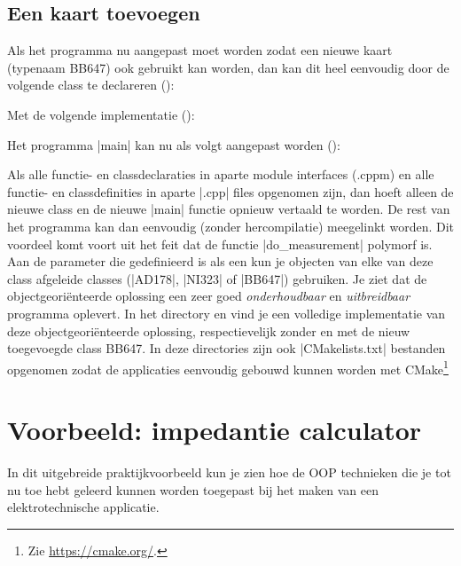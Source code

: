 \begin{cpplstShortInline}
\subsection{Een kaart toevoegen}
Als het programma nu aangepast moet worden zodat een nieuwe kaart (typenaam BB647) ook gebruikt kan worden, dan kan dit heel eenvoudig door de volgende class te declareren ():

Met de volgende implementatie ():

Het programma |main| kan nu als volgt aangepast worden ():

Als alle functie- en classdeclaraties in aparte module interfaces (.cppm) en alle functie- en classdefinities in aparte |.cpp| files opgenomen zijn, dan hoeft alleen de nieuwe class en de nieuwe |main| functie opnieuw vertaald te worden.
De rest van het programma kan dan eenvoudig (zonder hercompilatie) meegelinkt worden.
Dit voordeel komt voort uit het feit dat de functie |do_measurement| polymorf is.
Aan de parameter die gedefinieerd is als een \hbox{} kun je objecten van elke van deze class afgeleide classes (|AD178|, |NI323| of |BB647|) gebruiken.
Je ziet dat de objectgeoriënteerde oplossing een zeer goed \emph{onderhoudbaar} en \emph{uitbreidbaar} programma oplevert.
In het directory  en  vind je een volledige implementatie van deze objectgeoriënteerde oplossing, respectievelijk zonder en met de nieuw toegevoegde class BB647.
In deze directories zijn ook |CMakelists.txt| bestanden opgenomen zodat de applicaties eenvoudig gebouwd kunnen worden met CMake\footnote{%
	Zie \url{https://cmake.org/}.
} 

\section{Voorbeeld: impedantie calculator}
\label{impedance calculator}
In dit uitgebreide praktijkvoorbeeld kun je zien hoe de OOP technieken die je tot nu toe hebt geleerd kunnen worden toegepast bij het maken van een elektrotechnische applicatie.


\end{cpplstShortInline}
